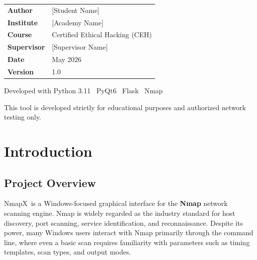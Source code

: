 \documentclass[12pt, a4paper]{report}
\newcommand{\NmapX}{NmapX}
\newcommand{\ReportMonthYear}{May 2026}
\newcommand{\StudentName}{[Student Name]}
\newcommand{\AcademyName}{[Academy Name]}
\newcommand{\SupervisorName}{[Supervisor Name]}
\begin{document}
\begin{titlepage}
\begin{center}
    \begin{tcolorbox}[
      colback=lightgray,
      colframe=synthpurple,
      arc=2mm,
      boxrule=0.8pt,
      width=0.85\textwidth
    ]
      \begin{tabularx}{\textwidth}{@{}lX@{}}
        \textbf{Author} & \StudentName \\
        \textbf{Institute} & \AcademyName \\
        \textbf{Course} & Certified Ethical Hacking (CEH) \\
        \textbf{Supervisor} & \SupervisorName \\
        \textbf{Date} & \ReportMonthYear \\
        \textbf{Version} & 1.0 \\
      \end{tabularx}
    \end{tcolorbox}

    \vfill
    {\small\textcolor{synthmuted}{Developed with Python 3.11 \textperiodcentered\ PyQt6 \textperiodcentered\ Flask \textperiodcentered\ Nmap}}\par
    \vspace{0.35cm}
    {\tiny\textcolor{synthmuted}{This tool is developed strictly for educational purposes and authorized network testing only.}}\par
  \end{center}
\end{titlepage}
\nopagecolor

\clearpage
\tableofcontents
\clearpage
\renewcommand{\listfigurename}{List of Figures}
\listoffigures
\clearpage
\renewcommand{\listtablename}{List of Tables}
\listoftables
\clearpage

\clearpage
\chapter{Introduction}

\section{Project Overview}
\NmapX\ is a Windows-focused graphical interface for the \textbf{Nmap} network scanning engine. Nmap is widely regarded as the industry standard for host discovery, port scanning, service identification, and reconnaissance. Despite its power, many Windows users interact with Nmap primarily through the command line, where even a basic scan requires familiarity with parameters such as timing templates, scan types, and output modes.
\end{document}
